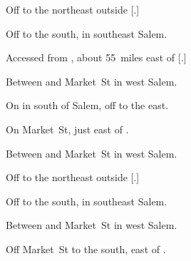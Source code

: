 

\begin{LocationList}

Off   to the northeast outside [.]

Off   to the south, in southeast Salem.

Accessed from , about 55~miles east of [.]

\Location{\GarageHQ \Garage}
Between  and Market~St in west Salem.

\Location{\GasStation \Gas \Rest}
On  in  south of Salem, off  to the east.

On  Market~St, just east of  .

Between  and Market~St in west Salem.

Off   to the northeast outside [.]

Off   to the south, in southeast Salem.

\Location{\RecruitmentAgency \Recruitment}
Between  and Market~St in west Salem.

Off  Market~St to the south, east of  .

\end{LocationList}
